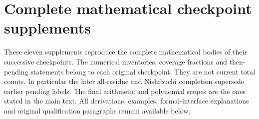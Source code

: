 \clearpage\section{Complete mathematical checkpoint supplements}\label{app:supplements}
These eleven supplements reproduce the complete mathematical bodies of their
successive checkpoints. The numerical inventories, coverage fractions and
then-pending statements belong to each original checkpoint. They are not
current total counts. In particular the later all-residue and Nishibuchi
completion supersede earlier pending labels. The final arithmetic and
polynomial scopes are the ones stated in the main text. All derivations,
examples, formal-interface explanations and original qualification paragraphs
remain available below.











